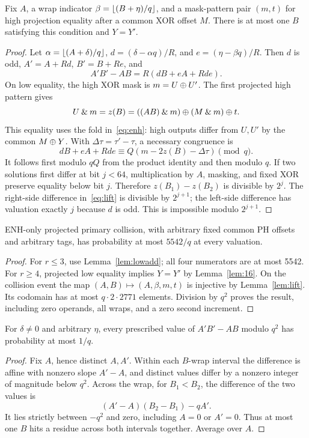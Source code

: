 \begin{lemma}\label{lem:lift}
Fix $A$, a wrap indicator $\beta=\left\lfloor(B+\eta)/q\right\rfloor$, and a mask-pattern pair $(m,t)$ for high projection equality after a common XOR offset $M$. There is at most one $B$ satisfying this condition and $Y=Y'$.
\end{lemma}
\begin{proof}
Let $\alpha=\left\lfloor(A+\delta)/q\right\rfloor$, $d=(\delta-\alpha q)/R$, and $e=(\eta-\beta q)/R$. Then $d$ is odd, $A'=A+Rd$, $B'=B+Re$, and
\[
 A'B'-AB=R(dB+eA+Rde).
\]
On low equality, the high XOR mask is $m=U\mathbin\oplus U'$. The first projected high pattern gives
\[
 U\mathbin{\&} m=z(B)=((AB)\mathbin{\&} m)\mathbin\oplus(M\mathbin{\&} m)\mathbin\oplus t.
\]
This equality uses the fold in~\eqref{eq:enh}: high outputs differ from $U,U'$ by the common $M\mathbin\oplus Y$. With $\Delta\tau=\tau'-\tau$, a necessary congruence is
\begin{equation}\label{eq:lift}
 dB+eA+Rde\equiv Q(m-2z(B)-\Delta\tau)\pmod q.
\end{equation}
It follows first modulo $qQ$ from the product identity and then modulo $q$. If two solutions first differ at bit $j<64$, multiplication by $A$, masking, and fixed XOR preserve equality below bit $j$. Therefore $z(B_1)-z(B_2)$ is divisible by $2^j$. The right-side difference in~\eqref{eq:lift} is divisible by $2^{j+1}$; the left-side difference has valuation exactly $j$ because $d$ is odd. This is impossible modulo $2^{j+1}$.
\end{proof}

\begin{corollary}\label{cor:5542}
ENH-only projected primary collision, with arbitrary fixed common PH offsets and arbitrary tags, has probability at most $5542/q$ at every valuation.
\end{corollary}
\begin{proof}
For $r\le3$, use Lemma~\ref{lem:lowadd}; all four numerators are at most 5542. For $r\ge4$, projected low equality implies $Y=Y'$ by Lemma~\ref{lem:16}. On the collision event the map $(A,B)\mapsto(A,\beta,m,t)$ is injective by Lemma~\ref{lem:lift}. Its codomain has at most $q\cdot2\cdot2771$ elements. Division by $q^2$ proves the result, including zero operands, all wraps, and a zero second increment.
\end{proof}

\begin{lemma}\label{lem:addproduct}
For $\delta\ne0$ and arbitrary $\eta$, every prescribed value of $A'B'-AB$ modulo $q^2$ has probability at most $1/q$.
\end{lemma}
\begin{proof}
Fix $A$, hence distinct $A,A'$. Within each $B$-wrap interval the difference is affine with nonzero slope $A'-A$, and distinct values differ by a nonzero integer of magnitude below $q^2$. Across the wrap, for $B_1<B_2$, the difference of the two values is
\[
 (A'-A)(B_2-B_1)-qA'.
\]
It lies strictly between $-q^2$ and zero, including $A=0$ or $A'=0$. Thus at most one $B$ hits a residue across both intervals together. Average over $A$.
\end{proof}

